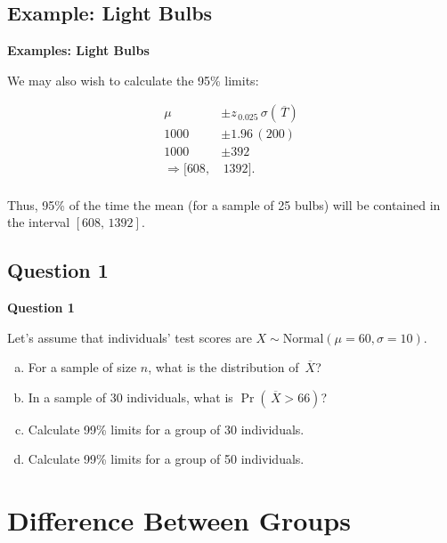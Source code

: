 \documentclass[compress]{beamer}        %
\makeatletter
\newcommand{\tcb}{\textcolor{beamer@blendedblue}}
\makeatother
\begin{document}
\subsection{Example: Light Bulbs}
\begin{frame}{\bf \tcb{Examples: Light Bulbs}}

We may also wish to calculate the 95\% limits:

\begin{align*}
\mu &\pm z_{\,0.025} \,\sigma(\,\overline{\!T})\\[0.2cm]
1000 &\pm 1.96 \,(200) \\[0.2cm]
1000 &\pm 392 \\[0.5cm]
\Rightarrow [608,&\,1392].\\
\end{align*}

Thus, 95\% of the time the mean (for a sample of 25 bulbs) will be contained in the interval $[608,\,1392]$.

\end{frame}




\subsection{Question 1}
\begin{frame}{\bf \tcb{Question 1}}

Let's assume that individuals' test scores are $X \sim \text{Normal}(\mu=60,\sigma=10)$.\\[0.3cm]

\begin{enumerate}[a)]\itemsep0.3cm
\item For a sample of size $n$, what is the distribution of $\,\overline{\!X}$?
\item In a sample of 30 individuals, what is $\Pr(\,\overline{\!X}>66)$?
\item Calculate 99\% limits for a group of 30 individuals.
\item Calculate 99\% limits for a group of 50 individuals.
\end{enumerate}


\end{frame}



\section{Difference Between Groups}
\end{document}

